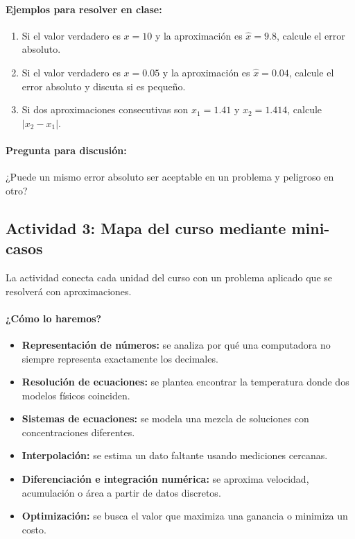\documentclass[a4,11pt]{aleph-notas}
\begin{document}
\paragraph{Ejemplos para resolver en clase:}
\begin{enumerate}[leftmargin=*]
    \item Si el valor verdadero es $x=10$ y la aproximación es $\widehat{x}=9.8$, calcule el error absoluto.
    \item Si el valor verdadero es $x=0.05$ y la aproximación es $\widehat{x}=0.04$, calcule el error absoluto y discuta si es pequeño.
    \item Si dos aproximaciones consecutivas son $x_1=1.41$ y $x_2=1.414$, calcule $|x_2-x_1|$.
\end{enumerate}

\paragraph{Pregunta para discusión:}
¿Puede un mismo error absoluto ser aceptable en un problema y peligroso en otro?

\subsection*{Actividad 3: Mapa del curso mediante mini-casos}

La actividad conecta cada unidad del curso con un problema aplicado que se resolverá con aproximaciones.

\paragraph{¿Cómo lo haremos?}
\begin{itemize}[leftmargin=*]
    \item \textbf{Representación de números:} se analiza por qué una computadora no siempre representa exactamente los decimales.
    \item \textbf{Resolución de ecuaciones:} se plantea encontrar la temperatura donde dos modelos físicos coinciden.
    \item \textbf{Sistemas de ecuaciones:} se modela una mezcla de soluciones con concentraciones diferentes.
    \item \textbf{Interpolación:} se estima un dato faltante usando mediciones cercanas.
    \item \textbf{Diferenciación e integración numérica:} se aproxima velocidad, acumulación o área a partir de datos discretos.
    \item \textbf{Optimización:} se busca el valor que maximiza una ganancia o minimiza un costo.
\end{itemize}
\end{document}
